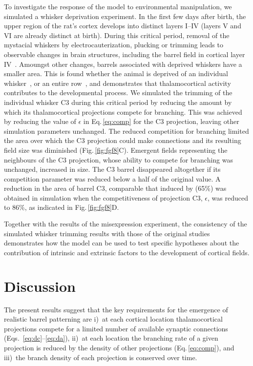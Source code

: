 \documentclass[9pt,lineno]{elife}
\newcommand{\MPthreePred}[1]{\textcolor{colmpthreepred}{#1}}
\begin{document}
\MPthreePred{To investigate the response of the model to environmental
  manipulation, we simulated a whisker deprivation experiment. In the first
  few days after birth, the upper region of the rat's cortex develops into
  distinct layers I--IV (layers V and VI are already distinct at
  birth). During this critical period, removal of the mystacial whiskers by
  electrocauterization, plucking or trimming leads to observable changes in
  brain structures, including the barrel field in cortical layer
  IV~\citep{jeanmonod_mouse_1981}. Amoungst other changes, barrels associated
  with deprived whiskers have a smaller area. This is found whether the animal
  is deprived of an individual whisker~\citep{kossut_effects_1992}, or an
  entire row~\citep{loos_somatosensory_1973}, and demonstrates that
  thalamocortical activity contributes to the developmental process. We
  simulated the trimming of the individual whisker C3 during this critical
  period by reducing the amount by which its thalamocortical projections
  compete for branching. This was achieved by reducing the value of $\epsilon$
  in Eq.\,\ref{eq:comp} for the C3 projection, leaving other simulation
  parameters unchanged. The reduced competition for branching limited the area
  over which the C3 projection could make connections and its resulting field
  size was diminished (Fig.\,\ref{fig:fgf8}C). Emergent fields representing
  the neighbours of the C3 projection, whose ability to compete for branching
  was unchanged, increased in size. The C3 barrel disappeared altogether if
  its competition parameter was reduced below a half of the original value. A
  reduction in the area of barrel C3, comparable that induced by
  \citealp{kossut_effects_1992} (65\%) was obtained in simulation when the
  competitiveness of projection C3, $\epsilon$, was reduced to 86\%, as
  indicated in Fig.\,\ref{fig:fgf8}D.}

\MPthreePred{Together with the results of the misexpression experiment, the
  consistency of the simulated whisker trimming results with those of the
  original studies demonstrates how the model can be used to test specific
  hypotheses about the contribution of intrinsic and extrinsic factors to the
  development of cortical fields.}

\section{Discussion}

The present results suggest that the key requirements for the emergence of
realistic barrel patterning are i)~at each cortical location thalamocortical
projections compete for a limited number of available synaptic connections
(Eqs.~\ref{eq:dc}--\ref{eq:da}), ii)~at each location the branching rate of a
given projection is reduced by the density of other projections
(Eq.\,\ref{eq:comp}), and iii)~the branch density of each projection is
conserved over time.
\end{document}
